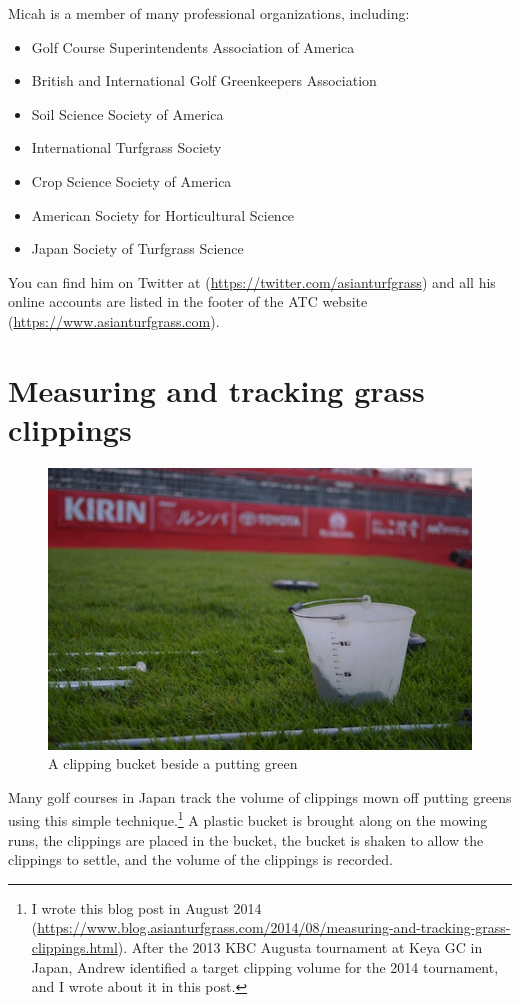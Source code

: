 \documentclass[12pt,b5,]{tufte-book}
\providecommand{\tightlist}{%
  \setlength{\itemsep}{0pt}\setlength{\parskip}{0pt}}
\begin{document}
Micah is a member of many professional organizations, including:

\begin{itemize}
\tightlist
\item
  Golf Course Superintendents Association of America
\item
  British and International Golf Greenkeepers Association
\item
  Soil Science Society of America
\item
  International Turfgrass Society
\item
  Crop Science Society of America
\item
  American Society for Horticultural Science
\item
  Japan Society of Turfgrass Science
\end{itemize}

You can find him on Twitter at (\url{https://twitter.com/asianturfgrass}) and all his online accounts are listed in the footer of the ATC website (\url{https://www.asianturfgrass.com}).

\hypertarget{measuring-and-tracking-grass-clippings}{%
\chapter{Measuring and tracking grass clippings}\label{measuring-and-tracking-grass-clippings}}

\begin{figure}
\centering
\includegraphics{img/b1-1.png}
\caption{A clipping bucket beside a putting green}
\end{figure}

Many golf courses in Japan track the volume of clippings mown off putting greens using this simple technique.\footnote{I wrote this blog post in August 2014 (\url{https://www.blog.asianturfgrass.com/2014/08/measuring-and-tracking-grass-clippings.html}). After the 2013 KBC Augusta tournament at Keya GC in Japan, Andrew identified a target clipping volume for the 2014 tournament, and I wrote about it in this post.} A plastic bucket is brought along on the mowing runs, the clippings are placed in the bucket, the bucket is shaken to allow the clippings to settle, and the volume of the clippings is recorded.
\end{document}
